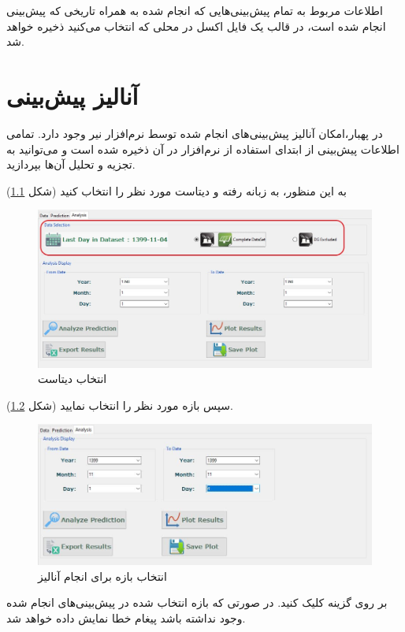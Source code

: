 \documentclass[a4paper,20pt,dvipsnames, usenames]{extbook}
\begin{document}
اطلاعات مربوط به تمام پیش‌بینی‌هایی که انجام شده به همراه تاریخی که پیش‌بینی انجام شده است، در قالب یک فایل اکسل در محلی که انتخاب می‌کنید ذخیره خواهد شد.
\chapter{آنالیز پیش‌بینی}
در پهبار،‌امکان آنالیز پیش‌بینی‌های انجام شده توسط نرم‌افزار نیر وجود دارد. تمامی اطلاعات پیش‌بینی از ابتدای استفاده از نرم‌افزار در آن ذخیره شده است و می‌توانید به تجزیه و تحلیل آن‌ها بپردازید.

به این منظور، به زبانه
رفته و دیتاست مورد نظر را انتخاب کنید (شکل
\ref{fig34})

\begin{figure}[!h]
	\centering
	\includegraphics[width = \textwidth]{fig37}
	\caption{انتخاب دیتاست}
	\label{fig34}
\end{figure}
سپس بازه مورد نظر را انتخاب نمایید (شکل
\ref{fig32}).

\begin{figure}[!h]
	\centering
	\includegraphics[width = \textwidth]{fig29}
	\caption{انتخاب بازه برای انجام آنالیز}
	\label{fig32}
\end{figure}
بر روی گزینه 
کلیک کنید.
در صورتی که بازه انتخاب شده در پیش‌بینی‌های انجام شده وجود نداشته باشد پیغام خطا نمایش داده خواهد شد.
\end{document}
